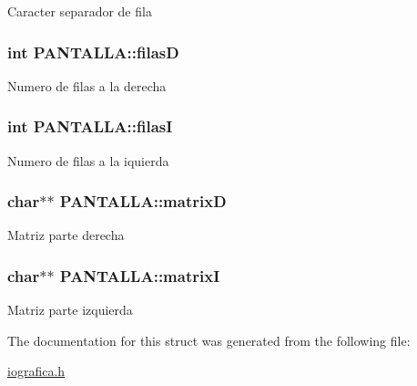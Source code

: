 \label{structPANTALLA_aa48180c68b4bae25a55f5ee460e3fd33}
Caracter separador de fila \hypertarget{structPANTALLA_ae07add488982084fa27b05836c5bcaf2}{
\subsubsection[{filasD}]{\setlength{\rightskip}{0pt plus 5cm}int {\bf PANTALLA::filasD}}}
\label{structPANTALLA_ae07add488982084fa27b05836c5bcaf2}
Numero de filas a la derecha \hypertarget{structPANTALLA_ae8d1b50a99bfad0fda834696535d283d}{
\subsubsection[{filasI}]{\setlength{\rightskip}{0pt plus 5cm}int {\bf PANTALLA::filasI}}}
\label{structPANTALLA_ae8d1b50a99bfad0fda834696535d283d}
Numero de filas a la iquierda \hypertarget{structPANTALLA_a54813792def91e4ea9551a39c209b856}{
\subsubsection[{matrixD}]{\setlength{\rightskip}{0pt plus 5cm}char$\ast$$\ast$ {\bf PANTALLA::matrixD}}}
\label{structPANTALLA_a54813792def91e4ea9551a39c209b856}
Matriz parte derecha \hypertarget{structPANTALLA_acd92ea589583ead084c96f500ca35254}{
\subsubsection[{matrixI}]{\setlength{\rightskip}{0pt plus 5cm}char$\ast$$\ast$ {\bf PANTALLA::matrixI}}}
\label{structPANTALLA_acd92ea589583ead084c96f500ca35254}
Matriz parte izquierda 

The documentation for this struct was generated from the following file:\begin{DoxyCompactItemize}
\item 
\hyperlink{iografica_8h}{iografica.h}\end{DoxyCompactItemize}

